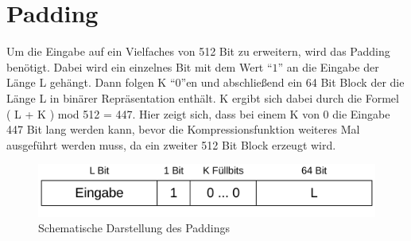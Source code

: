 \section{Padding}
\label{sec:sha256:padding}

Um die Eingabe auf ein Vielfaches von 512 Bit zu erweitern, wird das Padding benötigt. Dabei wird ein einzelnes Bit mit dem Wert "`$1$"' an die Eingabe der Länge L gehängt.
Dann folgen K "`$0$"'en und abschließend ein 64 Bit Block der die Länge L in binärer Repräsentation enthält. K ergibt sich dabei durch die Formel ( L + K ) mod 512 = 447.
Hier zeigt sich, dass bei einem K von 0 die Eingabe 447 Bit lang werden kann, bevor die Kompressionsfunktion weiteres Mal ausgeführt werden muss, da ein zweiter 512 Bit Block
erzeugt wird.

\begin{figure}[!h]
  \centering
  \includegraphics[scale=0.4]{images/sha256padding}
  \caption{Schematische Darstellung des Paddings}
  \label{fig:sha256padding}
\end{figure}